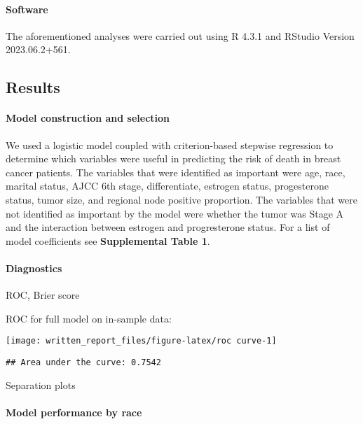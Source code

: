 \documentclass[]{article}
\let\oldparagraph\paragraph
\renewcommand{\paragraph}[1]{\oldparagraph{#1}\mbox{}}
\begin{document}
\hypertarget{software}{%
\paragraph{Software}\label{software}}

The aforementioned analyses were carried out using R 4.3.1 and RStudio
Version 2023.06.2+561.

\hypertarget{results}{%
\subsection{Results}\label{results}}

\hypertarget{model-construction-and-selection}{%
\paragraph{Model construction and
selection}\label{model-construction-and-selection}}

We used a logistic model coupled with criterion-based stepwise
regression to determine which variables were useful in predicting the
risk of death in breast cancer patients. The variables that were
identified as important were age, race, marital status, AJCC 6th stage,
differentiate, estrogen status, progesterone status, tumor size, and
regional node positive proportion. The variables that were not
identified as important by the model were whether the tumor was Stage A
and the interaction between estrogen and progresterone status. For a
list of model coefficients see \textbf{Supplemental Table 1}.

\hypertarget{diagnostics}{%
\paragraph{Diagnostics}\label{diagnostics}}

ROC, Brier score

ROC for full model on in-sample data:

\texttt{[image: written\_report\_files/figure-latex/roc curve-1]}

\begin{verbatim}
## Area under the curve: 0.7542
\end{verbatim}

Separation plots

\hypertarget{model-performance-by-race}{%
\paragraph{Model performance by race}\label{model-performance-by-race}}
\end{document}
